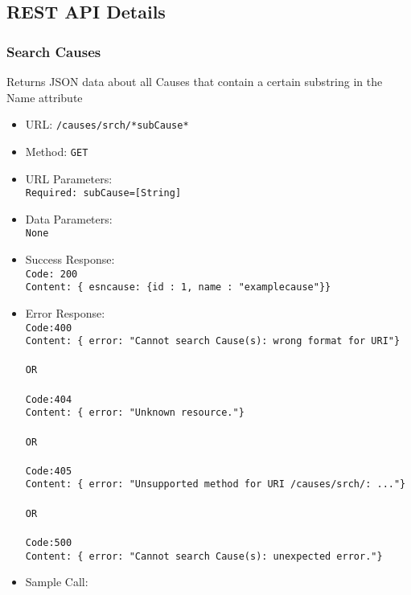 \subsection{REST API Details}


\subsubsection*{Search Causes}


Returns JSON data about all Causes that contain a certain substring in the Name attribute 


\begin{itemize}
    \item URL: \texttt{/causes/srch/*subCause*}
    \item Method: \texttt{GET}
    \item URL Parameters: \texttt{\\Required: subCause=[String] }
    \item Data Parameters: \texttt{\\None}
    \item Success Response: \texttt{\\Code: 200 \\Content: \{ esncause: \{id : 1, name : "examplecause"\}\}} 
    \item Error Response: \texttt{\\Code:400 \\Content: \{ error: "Cannot search Cause(s): wrong format for URI"\}
                                \\\\OR \\\\Code:404 \\Content: \{ error: "Unknown resource."\}
                                 \\\\OR \\\\Code:405 \\Content: \{ error: "Unsupported method for URI /causes/srch/: ..."\}
                                  \\\\OR \\\\Code:500 \\Content: \{ error: "Cannot search Cause(s): unexpected error."\}}
    \item Sample Call: \texttt{}
    
\end{itemize}

